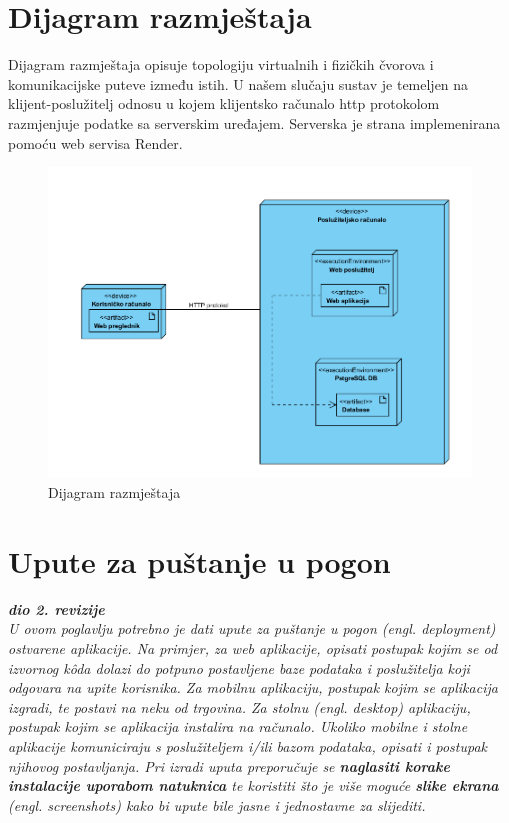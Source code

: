 			\eject 
		
		
		\section{Dijagram razmještaja}
			
			 Dijagram razmještaja opisuje topologiju virtualnih i fizičkih čvorova i komunikacijske puteve između istih. U našem slučaju sustav je temeljen na klijent-poslužitelj odnosu u kojem klijentsko računalo http protokolom razmjenjuje podatke sa serverskim uređajem. Serverska je strana implemenirana pomoću web servisa Render.
			 
			 \begin{figure}[H]
			\includegraphics[scale=0.5]{slike/deploymentDiagram.PNG} %
			\centering
			\caption{Dijagram razmještaja}
			\label{fig:implementacija}
		\end{figure}
			
			\eject 
		
		\section{Upute za puštanje u pogon}
		
			\textbf{\textit{dio 2. revizije}}\\
		
			 \textit{U ovom poglavlju potrebno je dati upute za puštanje u pogon (engl. deployment) ostvarene aplikacije. Na primjer, za web aplikacije, opisati postupak kojim se od izvornog kôda dolazi do potpuno postavljene baze podataka i poslužitelja koji odgovara na upite korisnika. Za mobilnu aplikaciju, postupak kojim se aplikacija izgradi, te postavi na neku od trgovina. Za stolnu (engl. desktop) aplikaciju, postupak kojim se aplikacija instalira na računalo. Ukoliko mobilne i stolne aplikacije komuniciraju s poslužiteljem i/ili bazom podataka, opisati i postupak njihovog postavljanja. Pri izradi uputa preporučuje se \textbf{naglasiti korake instalacije uporabom natuknica} te koristiti što je više moguće \textbf{slike ekrana} (engl. screenshots) kako bi upute bile jasne i jednostavne za slijediti.}
			
